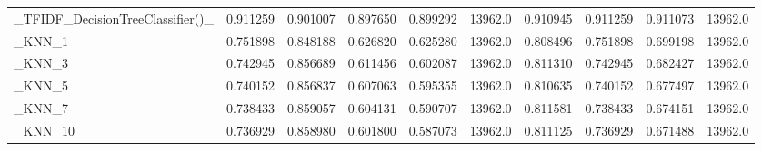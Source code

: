 \begin{tabular}{lrrrrrrrrr}
\_TFIDF\_DecisionTreeClassifier()\_                   &  0.911259 &         0.901007 &      0.897650 &        0.899292 &        13962.0 &            0.910945 &         0.911259 &           0.911073 &           13962.0 \\
\_KNN\_1                                             &  0.751898 &         0.848188 &      0.626820 &        0.625280 &        13962.0 &            0.808496 &         0.751898 &           0.699198 &           13962.0 \\
\_KNN\_3                                             &  0.742945 &         0.856689 &      0.611456 &        0.602087 &        13962.0 &            0.811310 &         0.742945 &           0.682427 &           13962.0 \\
\_KNN\_5                                             &  0.740152 &         0.856837 &      0.607063 &        0.595355 &        13962.0 &            0.810635 &         0.740152 &           0.677497 &           13962.0 \\
\_KNN\_7                                             &  0.738433 &         0.859057 &      0.604131 &        0.590707 &        13962.0 &            0.811581 &         0.738433 &           0.674151 &           13962.0 \\
\_KNN\_10                                            &  0.736929 &         0.858980 &      0.601800 &        0.587073 &        13962.0 &            0.811125 &         0.736929 &           0.671488 &           13962.0 \\
\bottomrule
\end{tabular}
